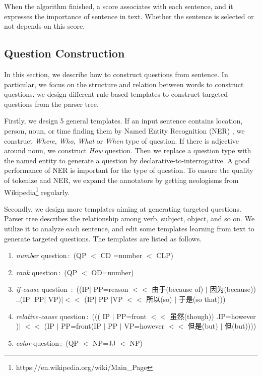 \documentclass[runningheads,UTF8,article]{comsis2}
\begin{document}
	When the algorithm finished, a score associates with each sentence, and it expresses the importance of sentence in text. Whether the sentence is selected or not depends on this score.
	
	\subsection{Question Construction}
	In this section, we describe how to construct questions from sentence. In particular, we focus on the structure and relation between words to construct questions. we design different rule-based templates to construct targeted questions from the parser tree.
	
	Firstly, we design 5 general templates. If an input sentence contains location, person, noun, or time finding them by Named Entity Recognition (NER) , we construct \emph{Where}, \emph{Who}, \emph{What} or \emph{When} type of question. If there is adjective around noun, we construct \emph{How} question. Then we replace a question type with the named entity to generate a question by declarative-to-interrogative. A good performance of NER is important for the type of question. To ensure the quality of tokenize and NER, we expand the annotators by getting neologisms from Wikipedia\footnote{https://en.wikipedia.org/wiki/Main\_Page} regularly.
	
	Secondly, we design more templates aiming at generating targeted questions. Parser tree describes the relationship among verb, subject, object, and so on. We utilize it to analyze each sentence, and edit some templates learning from text to generate targeted questions. The templates are listed as follows.
	\begin{enumerate}
		\item{\emph{number} question\,:\, (QP $ < $ CD =number  $ < $ CLP)}
		\item{\emph{rank} question\,:\, (QP $ < $ OD=number)}
		\item{\emph{if-cause} question \,:\, ((IP$ | $ PP=reason $ << $ 由于(because of) $ | $ 因为(because)) ..(IP$ | $ PP$ | $ VP)$ |<< $ (IP$ | $ PP $ | $VP $ << $ 所以(so) $ | $ 于是(so that)))}
		\item{\emph{relative-cause} question\,:\, ((( IP $ | $ PP=front $ << $ 虽然(though)) .IP=however )$ | $ $<<$ (IP $|$ PP=front(IP $|$ PP $|$ VP=however $<<$ 但是(but) $|$ 但(but)))) }
		
		\item{\emph{color} question\,:\, (QP $ < $ NP=JJ $ < $ NP) }
		
	\end{enumerate}
	
\end{document}
